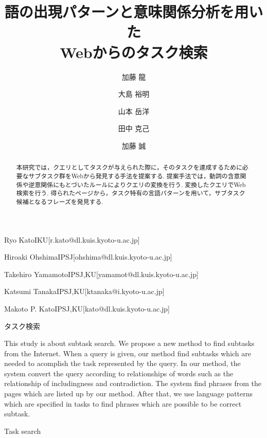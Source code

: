 \documentclass[submit,techreq]{ipsj}
\begin{document}
\title{語の出現パターンと意味関係分析を用いた\\
Webからのタスク検索}







\author{加藤 龍}{Ryo Kato}{IKU}[r.kato@dl.kuis.kyoto-u.ac.jp]
\author{大島 裕明}{Hiroaki Ohshima}{IPSJ}[ohshima@dl.kuis.kyoto-u.ac.jp]
\author{山本 岳洋}{Takehiro Yamamoto}{IPSJ,KU}[yamamot@dl.kuis.kyoto-u.ac.jp]
\author{田中 克己}{Katsumi Tanaka}{IPSJ,KU}[ktanaka@i.kyoto-u.ac.jp]
\author{加藤 誠}{Makoto P. Kato}{IPSJ,KU}[kato@dl.kuis.kyoto-u.ac.jp]

\begin{abstract}
本研究では，クエリとしてタスクが与えられた際に，そのタスクを達成するために必要なサブタスク群をWebから発見する手法を提案する. 提案手法では，動詞の含意関係や逆意関係にもとづいたルールによりクエリの変換を行う. 変換したクエリでWeb検索を行う. 得られたページから，タスク特有の言語パターンを用いて，サブタスク候補となるフレーズを発見する. 
\end{abstract}

\begin{jkeyword}
タスク検索
\end{jkeyword}

\begin{eabstract}
This study is about subtask search. We propose a new method to find subtasks from the Internet. When a query is given, our method find subtasks which are needed to acomplish the task represented by the query. In our method, the system convert the query according to relationships of words such as the relationship of includingness and contradiction. The system find phrases from the pages which are listed up by our method. After that, we use language patterns which are specified in tasks to find phrases which are possible to be correct subtask.
\end{eabstract}

\begin{ekeyword}
Task search
\end{ekeyword}

\maketitle
\end{document}

